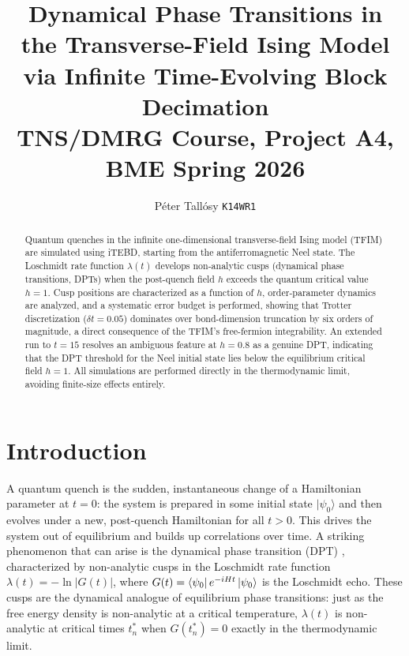 \documentclass[11pt,a4paper]{article}
\title{\textbf{Dynamical Phase Transitions in the Transverse-Field Ising Model\\
via Infinite Time-Evolving Block Decimation}\\[4pt]
\large TNS/DMRG Course, Project A4, BME Spring 2026}
\author{P\'eter Tall\'osy \quad \texttt{K14WR1}}
\date{}
\begin{document}
\maketitle
\vspace{-8pt}

\begin{abstract}
Quantum quenches in the infinite one-dimensional transverse-field Ising model
(TFIM) are simulated using iTEBD, starting from the antiferromagnetic Neel
state. The Loschmidt rate function $\lambda(t)$ develops non-analytic cusps
(dynamical phase transitions, DPTs) when the post-quench field $h$
exceeds the quantum critical value $h=1$. Cusp positions are characterized as
a function of $h$, order-parameter dynamics are analyzed, and a systematic
error budget is performed, showing that Trotter discretization ($\delta t = 0.05$) dominates
over bond-dimension truncation by six orders of magnitude, a direct consequence
of the TFIM's free-fermion integrability. An extended run to $t=15$ resolves
an ambiguous feature at $h=0.8$ as a genuine DPT, indicating that the DPT
threshold for the Neel initial state lies below the equilibrium critical field
$h=1$. All simulations are performed directly in the thermodynamic limit,
avoiding finite-size effects entirely.
\end{abstract}

\section{Introduction}
\label{sec:intro}

A quantum quench is the sudden, instantaneous change of a Hamiltonian
parameter at $t=0$: the system is prepared in some initial state $|\psi_0\rangle$
and then evolves under a new, post-quench Hamiltonian for all $t>0$. This
drives the system out of equilibrium and builds up correlations over time. A striking
phenomenon that can arise is the dynamical phase transition (DPT)
\cite{heyl2013}, characterized by non-analytic cusps in the Loschmidt rate
function $\lambda(t) = -\ln|G(t)|$, where $G(t) = \bra{\psi_0}e^{-iHt}\ket{\psi_0}$
is the Loschmidt echo. These cusps are the dynamical analogue of equilibrium
phase transitions: just as the free energy density is non-analytic at a
critical temperature, $\lambda(t)$ is non-analytic at critical times $t^*_n$
when $G(t^*_n) = 0$ exactly in the thermodynamic limit.
\end{document}
